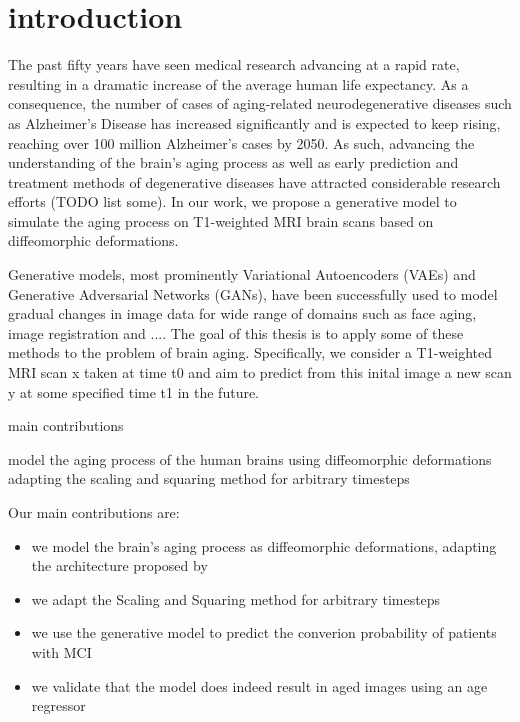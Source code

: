 \chapter{introduction}




The past fifty years have seen medical research advancing at a rapid rate, resulting in a dramatic increase of the average human life expectancy. As a consequence, the number of cases of aging-related neurodegenerative diseases such as Alzheimer's Disease has increased significantly and is expected to keep rising, reaching over 100 million Alzheimer's cases by 2050. As such, advancing the understanding of the brain's aging process as well as early prediction and treatment methods of degenerative diseases have attracted considerable research efforts (TODO list some). In our work, we propose a generative model to simulate the aging process on T1-weighted MRI brain scans based on diffeomorphic deformations.

 

Generative models, most prominently Variational Autoencoders (VAEs) and Generative Adversarial Networks (GANs), have been successfully used to model gradual changes in image data for wide range of domains such as face aging, image registration and .... The goal of this thesis is to apply some of these methods to the problem of brain aging. Specifically, we consider a T1-weighted MRI scan x taken at time t0 and aim to predict from this inital image a new scan y at some specified time t1 in the future. 





main contributions

model the aging process of the human brains using diffeomorphic deformations
adapting the scaling and squaring method for arbitrary timesteps

Our main contributions are:

\begin{itemize}
	\item we model the brain's aging process as diffeomorphic deformations, adapting the architecture proposed by \cite{voxelmorph}
	\item we adapt the Scaling and Squaring method for arbitrary timesteps

	\item we use the generative model to predict the converion probability of patients with MCI

	\item we validate that the model does indeed result in aged images using an age regressor


\end{itemize}
